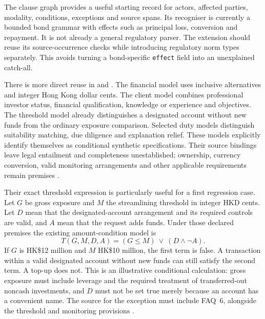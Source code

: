 The clause graph provides a useful starting record for actors, affected
parties, modality, conditions, exceptions and source spans. Its recogniser is
currently a bounded bond grammar with effects such as principal loss,
conversion and repayment. It is not already a general regulatory parser.
The extension should reuse its source-occurrence checks while introducing
regulatory norm types separately. This avoids turning a bond-specific
\texttt{effect} field into an unexplained catch-all.

There is more direct reuse in  and
. The financial model uses inclusive alternatives
and integer Hong Kong dollar cents. The client model combines professional
investor status, financial qualification, knowledge or experience and
objectives. The threshold model already distinguishes a designated account
without new funds from the ordinary exposure comparison. Selected duty
models distinguish suitability matching, due diligence and explanation relief.
These models explicitly identify themselves as conditional synthetic
specifications. Their source bindings leave legal entailment and completeness
unestablished; ownership, currency conversion, valid monitoring arrangements
and other applicable requirements remain premises
\citep{hkmaodrlsoftware2026}.

Their exact threshold expression is particularly useful for a first regression
case. Let $G$ be gross exposure and $M$ the streamlining threshold in integer
HKD cents. Let $D$ mean that the designated-account arrangement and its
required controls are valid, and $A$ mean that the request adds funds. Under
those declared premises the existing amount-condition model is
\begin{equation}
\label{eq:odrl-existing-threshold}
 T(G,M,D,A)=(G\leq M)\ \lor\ (D\land\neg A).
\end{equation}
If $G$ is HK\$12 million and $M$ HK\$10 million, the first term is false.
A transaction within a valid designated account without new funds can still
satisfy the second term. A top-up does not. This is an illustrative conditional
calculation: gross exposure must include leverage and the required treatment
of transferred-out noncash investments, and $D$ must not be set true merely
because an account has a convenient name. The source for the exception must
include FAQ~6, alongside the threshold and monitoring provisions
\citep[paras.~8.1--8.5]{sfcspiannex1}
\citep[FAQs~6--7]{sfcspiannex2}.

